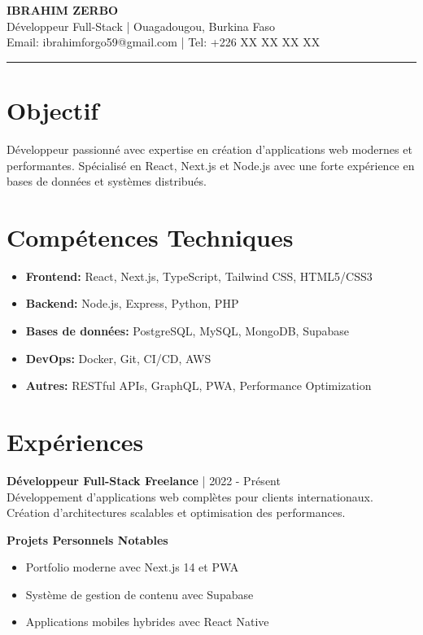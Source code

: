 \documentclass[11pt,a4paper]{article}
\begin{document}
\begin{center}
{\Large \textbf{IBRAHIM ZERBO}}\\[0.5cm]
Développeur Full-Stack | Ouagadougou, Burkina Faso\\
Email: ibrahimforgo59@gmail.com | Tel: +226 XX XX XX XX
\end{center}

\hrule
\vspace{0.5cm}

\section*{Objectif}
Développeur passionné avec expertise en création d'applications web modernes et performantes. Spécialisé en React, Next.js et Node.js avec une forte expérience en bases de données et systèmes distribués.

\section*{Compétences Techniques}
\begin{itemize}
\item \textbf{Frontend:} React, Next.js, TypeScript, Tailwind CSS, HTML5/CSS3
\item \textbf{Backend:} Node.js, Express, Python, PHP
\item \textbf{Bases de données:} PostgreSQL, MySQL, MongoDB, Supabase
\item \textbf{DevOps:} Docker, Git, CI/CD, AWS
\item \textbf{Autres:} RESTful APIs, GraphQL, PWA, Performance Optimization
\end{itemize}

\section*{Expériences}
\textbf{Développeur Full-Stack Freelance} | 2022 - Présent\\
Développement d'applications web complètes pour clients internationaux. Création d'architectures scalables et optimisation des performances.

\textbf{Projets Personnels Notables}
\begin{itemize}
\item Portfolio moderne avec Next.js 14 et PWA
\item Système de gestion de contenu avec Supabase
\item Applications mobiles hybrides avec React Native
\end{itemize}
\end{document}
